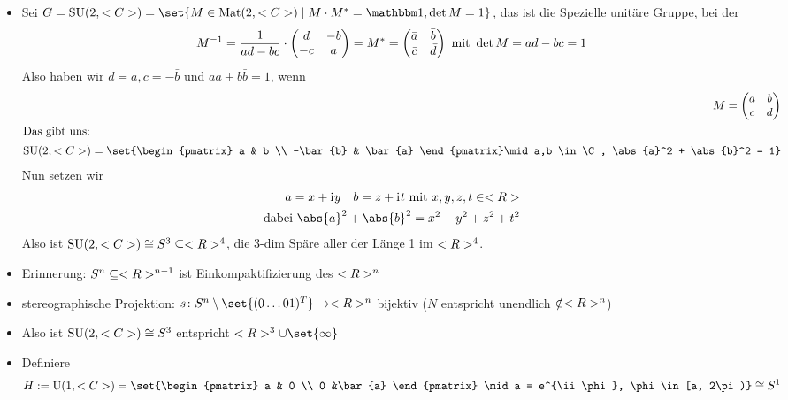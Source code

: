 \begin{example}
	\begin{itemize}
		\item Sei $G = \SU(2,\C) = \set{M \in \Mat(2,\C) \mid M\cdot M^{\ast} = \indi, \det M = 1}$, das ist die Spezielle unitäre Gruppe, bei der
		\begin{align*}
		M^{-1} = \frac{1}{ad-bc} \cdot \begin{pmatrix}
		d & -b \\ -c & a
		\end{pmatrix} = M^{\ast} = \begin{pmatrix}
		\bar{a} & \bar{b}\\ \bar{c} & \bar{d}
		\end{pmatrix} \mit \det M = ad - bc = 1
		\end{align*}
		Also haben wir $d = \bar{a}, c = -\bar{b}$ und $a\bar{a} + b\bar{b} = 1$, wenn
		\begin{align*}
		M = \begin{pmatrix}
		a & b\\ c & d
		\end{pmatrix}\\
		\intertext{Das gibt uns:}
		\SU(2,\C) = \set{\begin{pmatrix}
			a & b \\ -\bar{b} & \bar{a}
			\end{pmatrix}\mid a,b \in \C, \abs{a}^2 + \abs{b}^2 = 1}
		\end{align*}
		Nun setzen wir
		\begin{align*}
		a = x + \ii y \quad b = z + \ii t \mit x,y,z,t \in \R\\
		\text{dabei } \abs{a}^2 + \abs{b}^2 = x^2 + y^2 + z^2 + t^2
		\end{align*}
		Also ist $\SU(2,\C) \cong S^3 \subseteq\R^4$, die 3-dim Späre aller der Länge 1 im $\R^4$.
		\item Erinnerung: $S^n \subseteq \R^{n-1}$ ist Einkompaktifizierung des $\R^n$
		\item stereographische Projektion: $s \colon S^n \setminus \set{(0 \dots 0 1)^T} \to \R^n$ bijektiv ($N$ entspricht unendlich $\notin \R^n$)
		\item Also ist $\SU(2,\C) \cong S^3$ entspricht $\R^3 \cup \set{\infty}$
		\item Definiere
		\begin{align*}
			H:= \UU(1,\C) = \set{\begin{pmatrix}
				a & 0 \\ 0 &\bar{a}
				\end{pmatrix} \mid a = e^{\ii \phi}, \phi \in [a, 2\pi)} \cong S^1

\end{align*}
\end{itemize}
\end{example}
